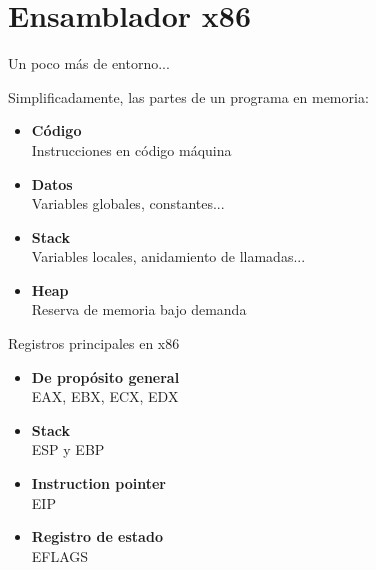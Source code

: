 \documentclass{beamer}
\begin{document}
\section{Ensamblador x86}

\begin{frame}{Un poco más de entorno...}
\begin{center}
\vspace{-3ex}
Simplificadamente, las partes de un programa en memoria:
\vspace{-2ex}
\end{center}
\begin{itemize}
\item \textbf{Código} \\ \hspace{10ex}Instrucciones en código máquina
\vspace{2ex}
\item \textbf{Datos} \\ \hspace{10ex}Variables globales, constantes...
\vspace{2ex}
\item \textbf{Stack} \\ \hspace{10ex}Variables locales, anidamiento de llamadas...
\vspace{2ex}
\item \textbf{Heap} \\ \hspace{10ex}Reserva de memoria bajo demanda

\end{itemize}
\end{frame}

\begin{frame}{Registros principales en x86}
\begin{itemize}
\item \textbf{De propósito general} \\ \hspace{4ex}EAX, EBX, ECX, EDX
\vspace{3ex}
\item \textbf{Stack} \\ \hspace{4ex}ESP y EBP
\vspace{3ex}
\item \textbf{Instruction pointer} \\ \hspace{4ex}EIP
\vspace{3ex}
\item \textbf{Registro de estado} \\ \hspace{4ex}EFLAGS
\end{itemize}
\end{frame}
\end{document}
